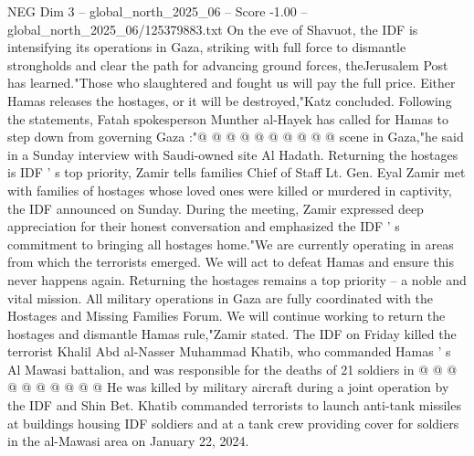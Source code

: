 \begin{textsample}{NEG Dim 3 – global\_north\_2025\_06 – Score -1.00 – global\_north\_2025\_06/125379883.txt}
On the eve of Shavuot, the IDF is intensifying its operations in Gaza, striking with full force to dismantle strongholds and clear the path for advancing ground forces, theJerusalem Post has learned."Those who slaughtered and fought us will pay the full price.
Either Hamas releases the hostages, or it will be destroyed,"Katz concluded.
Following the statements, Fatah spokesperson Munther al-Hayek has called for Hamas to step down from governing Gaza :"@ @ @ @ @ @ @ @ @ @ scene in Gaza,"he said in a Sunday interview with Saudi-owned site Al Hadath.
Returning the hostages is IDF ' s top priority, Zamir tells families Chief of Staff Lt.
Gen.
Eyal Zamir met with families of hostages whose loved ones were killed or murdered in captivity, the IDF announced on Sunday.
During the meeting, Zamir expressed deep appreciation for their honest conversation and emphasized the IDF ' s commitment to bringing all hostages home."We are currently operating in areas from which the terrorists emerged.
We will act to defeat Hamas and ensure this never happens again.
Returning the hostages remains a top priority -- a noble and vital mission.
All military operations in Gaza are fully coordinated with the Hostages and Missing Families Forum.
We will continue working to return the hostages and dismantle Hamas rule,"Zamir stated.
The IDF on Friday killed the terrorist Khalil Abd al-Nasser Muhammad Khatib, who commanded Hamas ' s Al Mawasi battalion, and was responsible for the deaths of 21 soldiers in @ @ @ @ @ @ @ @ @ @ He was killed by military aircraft during a joint operation by the IDF and Shin Bet.
Khatib commanded terrorists to launch anti-tank missiles at buildings housing IDF soldiers and at a tank crew providing cover for soldiers in the al-Mawasi area on January 22, 2024.

\end{textsample}
